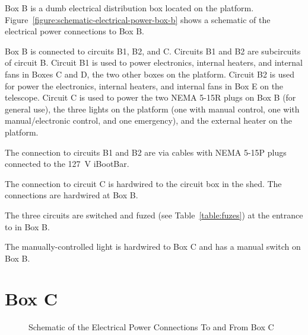 Box B is a dumb electrical distribution box located on the platform.  Figure~\ref{figure:schematic-electrical-power-box-b} shows a schematic of the electrical power connections to Box B.

Box B is connected to circuits B1, B2, and C. Circuits B1 and B2 are subcircuits of circuit B. Circuit B1 is used to power electronics, internal heaters, and internal fans in Boxes C and D, the two other boxes on the platform. Circuit B2 is used for power the electronics, internal heaters, and internal fans in Box E on the telescope. Circuit C is used to power the two NEMA 5-15R plugs on Box B (for general use), the three lights on the platform (one with manual control, one with manual/electronic control, and one emergency), and the external heater on the platform.

The connection to circuits B1 and B2 are via cables with NEMA 5-15P plugs connected to the 127~V iBootBar. 

The connection to circuit C is hardwired to the circuit box in the shed. The connections are hardwired at Box B.

The three circuits are switched and fuzed (see Table~\ref{table:fuzes}) at the entrance to in Box B.

The manually-controlled light is hardwired to Box C and has a manual switch on Box B.

\section{Box C}

\begin{figure}
\begin{center}
\footnotesize 
{}
\end{center}
\caption{Schematic of the Electrical Power Connections To and From Box C}
\label{figure:schematic-electrical-power-box-c}
\end{figure}

